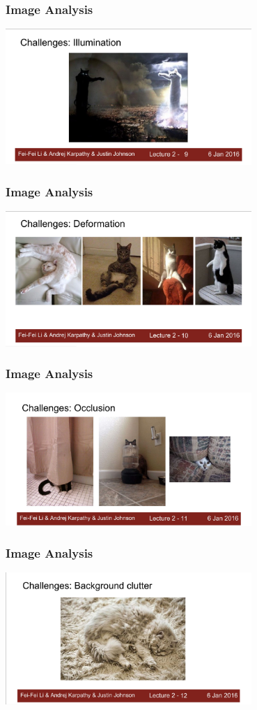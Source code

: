 \documentclass[aspectratio=169,usenames,dvipsnames]{beamer}
\begin{document}
\begin{frame}
    \frametitle{Image Analysis}
    \centering
    \vspace{-1.2\baselineskip}
    \includegraphics[width=0.7\textwidth]{Figures/stn4.png}
\end{frame}
\begin{frame}
    \frametitle{Image Analysis}
    \centering
    \vspace{-1.2\baselineskip}
    \includegraphics[width=0.7\textwidth]{Figures/stn5.png}
\end{frame}
\begin{frame}
    \frametitle{Image Analysis}
    \centering
    \vspace{-1.2\baselineskip}
    \includegraphics[width=0.7\textwidth]{Figures/stn6.png}
\end{frame}
\begin{frame}
    \frametitle{Image Analysis}
    \centering
    \vspace{-1.2\baselineskip}
    \includegraphics[width=0.7\textwidth]{Figures/stn7.png}
\end{frame}
\end{document}

